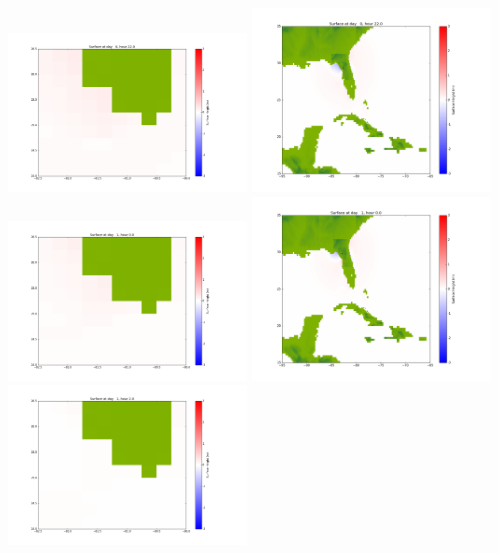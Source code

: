 \documentclass[11pt]{article}
\begin{document}
\vskip 10pt 
\includegraphics[width=0.475\textwidth]{frame0035fig1001.png}
\includegraphics[width=0.475\textwidth]{frame0035fig1002.png}
\vskip 10pt 
\includegraphics[width=0.475\textwidth]{frame0036fig1001.png}
\includegraphics[width=0.475\textwidth]{frame0036fig1002.png}
\vskip 10pt 
\includegraphics[width=0.475\textwidth]{frame0037fig1001.png}
\end{document}
